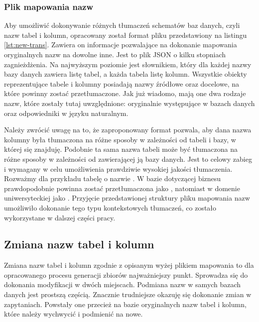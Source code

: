 \subsubsection{Plik mapowania nazw}
Aby umożliwić dokonywanie różnych tłumaczeń schematów baz danych, czyli nazw tabel i kolumn, opracowany został format pliku przedstawiony na listingu \ref{lst:new-trans}. Zawiera on informacje pozwalające na dokonanie mapowania oryginalnych nazw na dowolne inne. Jest to plik JSON o kilku stopniach zagnieżdżenia. Na najwyższym poziomie jest słownikiem, który dla każdej nazwy bazy danych zawiera listę tabel, a każda tabela listę kolumn. Wszystkie obiekty reprezentujące tabele i kolumny posiadają nazwy źródłowe oraz docelowe, na które powinny zostać przetłumaczone. Jak już wiadomo, mają one dwa rodzaje nazw, które zostały tutaj uwzględnione: oryginalnie występujące w bazach danych oraz odpowiedniki w języku naturalnym.

\begin{minipage}{\linewidth}

\end{minipage}

Należy zwrócić uwagę na to, że zaproponowany format pozwala, aby dana nazwa kolumny była tłumaczona na różne sposoby w zależności od tabeli i bazy, w której się znajduję. Podobnie ta sama nazwa tabeli może być tłumaczona na różne sposoby w zależności od zawierającej ją bazy danych. Jest to celowy zabieg i wymagany w celu umożliwienia prawdziwie wysokiej jakości tłumaczenia. Rozważmy dla przykładu tabelę o nazwie . W bazie dotyczącej biznesu prawdopodobnie powinna zostać przetłumaczona jako , natomiast w domenie uniwersyteckiej jako . Przyjęcie przedstawionej struktury pliku mapowania nazw umożliwiło dokonanie tego typu kontekstowych tłumaczeń, co zostało wykorzystane w dalszej części pracy.

\subsection{Zmiana nazw tabel i kolumn}
Zmiana nazw tabel i kolumn zgodnie z opisanym wyżej plikiem mapowania to dla opracowanego procesu generacji zbiorów najważniejszy punkt. Sprowadza się do dokonania modyfikacji w dwóch miejscach. Podmiana nazw w samych bazach danych  jest prostszą częścią. Znacznie trudniejsze okazuję się dokonanie zmian w zapytaniach. Powstały one przecież na bazie oryginalnych nazw tabel i kolumn, które należy wychwycić i podmienić na nowe.

